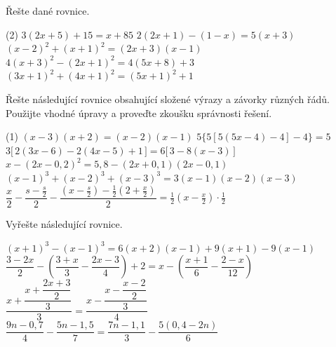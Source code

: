\documentclass[12pt,a4paper]{article}
\begin{document}
\begin{exercise}
  Řešte dané rovnice.
  \begin{tasks}(2)
    \task \(3(2x + 5) + 15 = x + 85\)
    \task \(2(2x + 1) - (1 - x) = 5(x + 3)\)
    \task \((x - 2)^2 + (x + 1)^2 = (2x + 3)(x - 1)\)
    \task \(4(x + 3)^2 - (2x + 1)^2 = 4(5x + 8) + 3\)
    \task \((3x + 1)^2 + (4x + 1)^2 = (5x + 1)^2 + 1\)
  \end{tasks}
\end{exercise}


\begin{exercise}
  Řešte následující rovnice obsahující složené výrazy a závorky různých řádů.  
  Použijte vhodné úpravy a proveďte zkoušku správnosti řešení.
  \begin{tasks}(1)
    \task \((x-3)(x+2) = (x-2)(x-1)\)
    \task \(5\{ 5[ 5(5x-4)-4] -4\}  = 5\)
    \task \(3\bigl[\,2(3x - 6) - 2(4x - 5) + 1\,\bigr] = 6\bigl[\,3 - 8(x - 3)\,\bigr]\)
    \task \(x - (2x - 0{,}2)^2 = 5{,}8 - (2x + 0{,}1)(2x - 0{,}1)\)
    \task \((x-1)^3 + (x-2)^3 + (x-3)^3 = 3(x-1)(x-2)(x-3)\)
    \task \(\dfrac{x}{2} - \dfrac{s - \tfrac{s}{2}}{2}
            - \dfrac{\left(x - \tfrac{s}{2}\right) - \tfrac12\left(2 + \tfrac{x}{2}\right)}{2}
            = \tfrac12\!\left(x - \tfrac{x}{2}\right)\!\cdot \tfrac12\)
  \end{tasks}
\end{exercise}


\begin{exercise}
  Vyřešte následující rovnice.
  \begin{tasks}
    \task \((x + 1)^3 - (x - 1)^3 = 6(x + 2)(x - 1) + 9(x + 1) - 9(x - 1)\)
    \task \(\dfrac{3 - 2x}{2} - \left(\dfrac{3 + x}{3} - \dfrac{2x - 3}{4}\right) + 2
    = x - \left(\dfrac{x + 1}{6} - \dfrac{2 - x}{12}\right)\)
    \task \(\dfrac{x + \dfrac{x + \dfrac{2x + 3}{2}}{3}}{3} = \dfrac{x - \dfrac{x - \dfrac{x - 2}{2}}{3}}{4}\) %
    \task \(\dfrac{9n - 0{,}7}{4} - \dfrac{5n - 1{,}5}{7}  = \dfrac{7n - 1{,}1}{3} - \dfrac{5(0{,}4 - 2n)}{6}\)
  \end{tasks}
\end{exercise}
\end{document}
